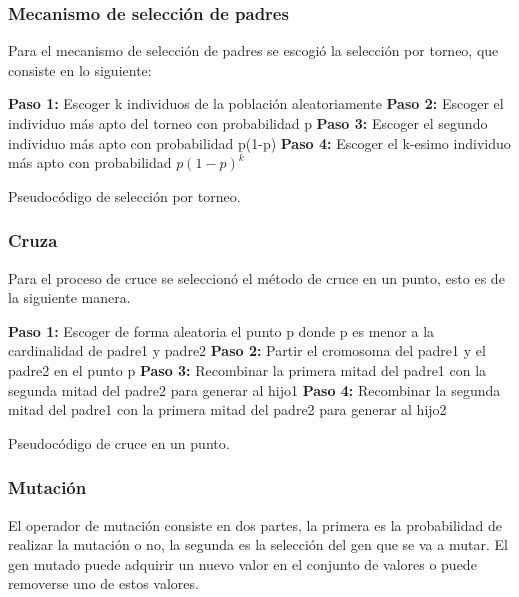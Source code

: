 \subsubsection{Mecanismo de selección de padres}

Para el mecanismo de selección de padres se escogió la selección por torneo, que consiste en lo siguiente:

\begin{algorithm}[H] 
	\SetAlgoLined
	\textbf{Paso 1:} Escoger k individuos de la población aleatoriamente\;
	\textbf{Paso 2:} Escoger el individuo más apto del torneo con probabilidad p\;
	\textbf{Paso 3:} Escoger el segundo individuo más apto con probabilidad p(1-p) \;
	\textbf{Paso 4:} Escoger el k-esimo individuo más apto con probabilidad $p(1-p)^k$ \;
	\caption{Pseudocódigo de selección por torneo.}
\end{algorithm}

\subsubsection{Cruza}

Para el proceso de cruce se seleccionó el método de cruce en un punto, esto es de la siguiente manera.
\\
\begin{algorithm}[H] 
	\SetAlgoLined
	\textbf{Paso 1:} Escoger de forma aleatoria el punto p donde p es menor a la cardinalidad de padre1 y padre2\;
	\textbf{Paso 2:} Partir el cromosoma del padre1 y el padre2 en el punto p\;
	\textbf{Paso 3:} Recombinar la primera mitad del padre1 con la segunda mitad del padre2 para generar al hijo1\;
	\textbf{Paso 4:} Recombinar la segunda mitad del padre1 con la primera mitad del padre2 para generar al hijo2\;
	\caption{Pseudocódigo de cruce en un punto.}
\end{algorithm}

\subsubsection{Mutación}

El operador de mutación consiste en dos partes, la primera es la probabilidad de realizar la mutación o no, la segunda es la selección del gen que se va a mutar. El gen mutado puede adquirir un nuevo valor en el conjunto de valores o puede removerse uno de estos valores.

